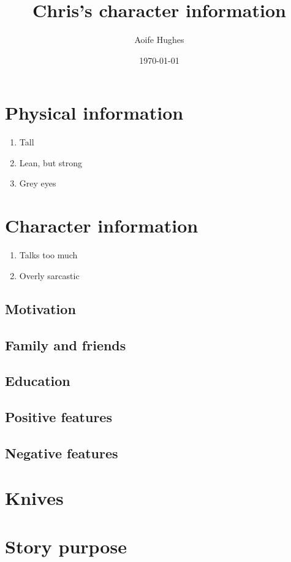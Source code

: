 \documentclass[11pt]{article}
\title{Chris's character information}
\author{Aoife Hughes}
\date{\today}
\begin{document}
\maketitle	
\pagebreak


\section{Physical information}

\begin{enumerate}
    \item Tall 
    \item Lean, but strong
    \item Grey eyes
 
\end{enumerate}

\section{Character information}

\begin{enumerate}
    \item Talks too much
    \item Overly sarcastic
\end{enumerate}

\subsection{Motivation}

\subsection{Family and friends}

\subsection{Education}

\subsection{Positive features}

\subsection{Negative features}

\section{Knives}



\section{Story purpose}
\end{document}
